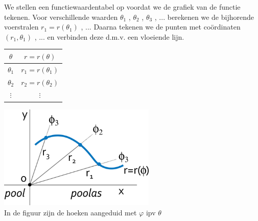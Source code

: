 We stellen een functiewaardentabel op voordat we de grafiek
van de functie tekenen. Voor verschillende waarden $\theta_{1}$ ,
$\theta_{2}$ , $\theta_{3}$ , ... berekenen we de bijhorende voerstralen
$r_{1}=r\left(\theta_{1}\right)$ , ... Daarna tekenen we de punten
met co\"ordinaten $\left(r_{1},\theta_{1}\right)$ , ... en verbinden
deze d.m.v. een vloeiende lijn.

\begin{minipage}{.48\linewidth}
	\centering
	\begin{tabular}{c|c}
		$\theta$ & $r=r(\theta)$\\
		\hline 
		$\theta_{1}$ & $r_{1}=r\left(\theta_{1}\right)$ \\
		$\theta_{2}$ & $r_{2}=r\left(\theta_{2}\right)$ \\
		$\vdots$ & $\vdots$\\
	\end{tabular}
\end{minipage}
\begin{minipage}{.48\linewidth}
\includegraphics[height=5cm]{2_elem_rekenvaardigheden_B/inputs/figuur11}\\
In de figuur zijn de hoeken aangeduid met $\varphi$ ipv $\theta$
\end{minipage}



